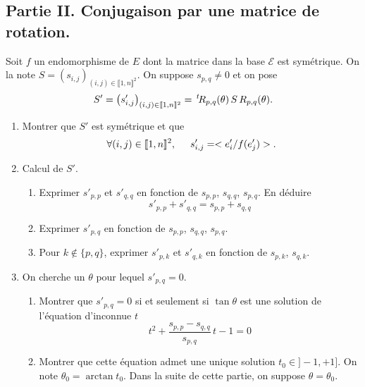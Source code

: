 \subsection*{Partie II. Conjugaison par une matrice de rotation.}
Soit $f$ un endomorphisme de $E$ dont la matrice dans la base $\mathcal{E}$ est symétrique. On la note $S = \left( s_{i,j}\right)_{(i,j)\in \llbracket 1,n \rrbracket^2}$. On suppose $s_{p,q}\neq 0$ et on pose 
\begin{displaymath}
 S' = \left( s'_{i,j}\right)_{(i,j)\in \llbracket 1,n \rrbracket^2} = \,\mathstrut^t\! R_{p,q}(\theta) \, S \, R_{p,q}(\theta) . 
\end{displaymath}
\begin{enumerate}
 \item Montrer que $S'$ est symétrique et que 
\begin{displaymath}
 \forall (i,j)\in \llbracket 1,n \rrbracket^2, \hspace{0.5cm} s'_{i,j} = < e'_i/f(e'_j) >.
\end{displaymath}
 \item Calcul de $S'$.
\begin{enumerate}
 \item Exprimer $s'_{p,p}$ et $s'_{q,q}$ en fonction de $s_{p,p}$, $s_{q,q}$, $s_{p,q}$. En déduire 
\begin{displaymath}
 s'_{p,p} + s'_{q,q} = s_{p,p} + s_{q,q}
\end{displaymath}
 \item Exprimer $s'_{p,q}$ en fonction de $s_{p,p}$, $s_{q,q}$, $s_{p,q}$.
 \item Pour $k\notin \{p,q\}$, exprimer $s'_{p,k}$ et $s'_{q,k}$ en fonction de $s_{p,k}$, $s_{q,k}$.
\end{enumerate}
 
 \item On cherche un $\theta$ pour lequel $s'_{p,q}=0$.
\begin{enumerate}
 \item Montrer que $s'_{p,q}=0$ si et seulement si $\tan \theta$ est une solution de l'équation d'inconnue $t$
\begin{equation}
 t^2 + \frac{s_{p,p}-s_{q,q}}{s_{p,q}}\,t -1 = 0
\end{equation}
 \item Montrer que cette équation admet une unique solution $t_0 \in ] -1, +1 ]$. On note $\theta_0 = \arctan t_0$. Dans la suite de cette partie, on suppose $\theta = \theta_0$.
\end{enumerate}


\end{enumerate}

